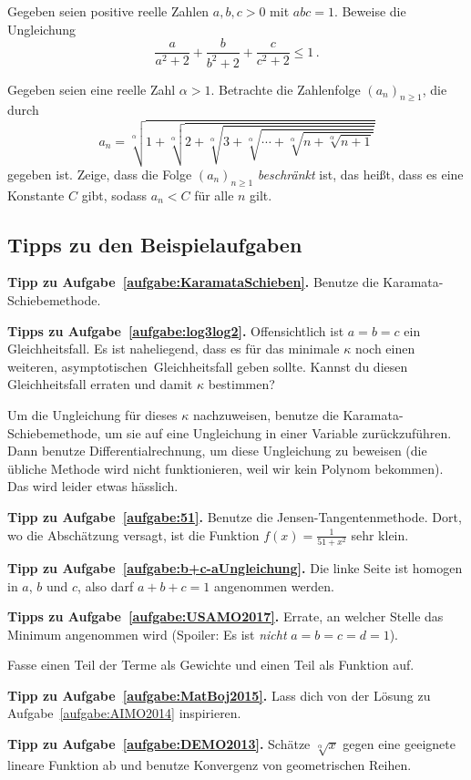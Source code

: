 \begin{aufgabe*}\label{aufgabe:MatBoj2015}
	Gegeben seien positive reelle Zahlen $a,b,c>0$ mit $abc=1$. Beweise die Ungleichung
	\begin{equation*}
		\frac{a}{a^2+2}+\frac{b}{b^2+2}+\frac{c}{c^2+2}\leqslant 1\,.
	\end{equation*}
\end{aufgabe*}

\begin{aufgabe*}\label{aufgabe:DEMO2013}
	Gegeben seien eine reelle Zahl $\alpha>1$. Betrachte die Zahlenfolge $(a_n)_{n\geqslant 1}$, die durch
	\begin{equation*}
		a_n=\sqrt[\alpha]{1+\sqrt[\alpha]{2+\sqrt[\alpha]{3+\sqrt[\alpha]{\dotsb+\sqrt[\alpha]{n+\sqrt[\alpha]{n+1}}}}}}
	\end{equation*}
	gegeben ist. Zeige, dass die Folge $(a_n)_{n\geqslant 1}$ \emph{beschränkt} ist, das heißt, dass es eine Konstante $C$ gibt, sodass $a_n<C$ für alle $n$ gilt.
\end{aufgabe*}
\subsection*{Tipps zu den Beispielaufgaben}
\textbf{Tipp zu Aufgabe~\ref{aufgabe:KaramataSchieben}.} Benutze die Karamata-Schiebemethode.%

\textbf{Tipps zu Aufgabe~\ref{aufgabe:log3log2}.} Offensichtlich ist $a=b=c$ ein Gleichheitsfall. Es ist naheliegend, dass es für das minimale $\kappa$ noch einen weiteren, \glqq asymptotischen\grqq\ Gleichheitsfall geben sollte. Kannst du diesen Gleichheitsfall erraten und damit $\kappa$ bestimmen?

Um die Ungleichung für dieses $\kappa$ nachzuweisen, benutze die Karamata-Schiebemethode, um sie auf eine Ungleichung in einer Variable zurückzuführen. Dann benutze Differentialrechnung, um diese Ungleichung zu beweisen (die übliche Methode wird nicht funktionieren, weil wir kein Polynom bekommen). Das wird leider etwas hässlich.

\textbf{Tipp zu Aufgabe~\ref{aufgabe:51}.} Benutze die Jensen-Tangentenmethode. Dort, wo die Abschätzung versagt, ist die Funktion $f(x)=\frac1{51+x^2}$ sehr klein.

\textbf{Tipp zu Aufgabe~\ref{aufgabe:b+c-aUngleichung}.} Die linke Seite ist homogen in $a$, $b$ und $c$, also darf $a+b+c=1$ angenommen werden.

\textbf{Tipps zu Aufgabe~\ref{aufgabe:USAMO2017}.} Errate, an welcher Stelle das Minimum angenommen wird (Spoiler: Es ist \emph{nicht} $a=b=c=d=1$).

Fasse einen Teil der Terme als Gewichte und einen Teil als Funktion auf.

\textbf{Tipp zu Aufgabe~\ref{aufgabe:MatBoj2015}.} Lass dich von der Lösung zu Aufgabe~\ref{aufgabe:AIMO2014} inspirieren.

\textbf{Tipp zu Aufgabe~\ref{aufgabe:DEMO2013}.} Schätze $\sqrt[\alpha]{x}$ gegen eine geeignete lineare Funktion ab und benutze Konvergenz von geometrischen Reihen.